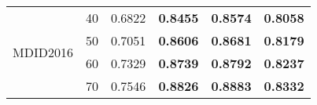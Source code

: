 \documentclass{article}
\begin{document}
\begin{table}
\begin{tabular}{||l|l||cccc||}
\midrule \midrule
\multirow{4}{*}{\begin{turn}{-90}MDID2016\end{turn}}&40&0.6822&\textcolor[rgb]{0,0,1}{\textbf{0.8455}}&\textcolor[rgb]{1,0,0}{\textbf{0.8574}}&\textbf{0.8058}\\
\cmidrule{2-6}
&50&0.7051&\textcolor[rgb]{0,0,1}{\textbf{0.8606}}&\textcolor[rgb]{1,0,0}{\textbf{0.8681}}&\textbf{0.8179}\\
\cmidrule{2-6}
&60&0.7329&\textcolor[rgb]{0,0,1}{\textbf{0.8739}}&\textcolor[rgb]{1,0,0}{\textbf{0.8792}}&\textbf{0.8237}\\
\cmidrule{2-6}
&70&0.7546&\textcolor[rgb]{0,0,1}{\textbf{0.8826}}&\textcolor[rgb]{1,0,0}{\textbf{0.8883}}&\textbf{0.8332}\\
\midrule \midrule
\end{tabular}
\end{table}
\end{document}
